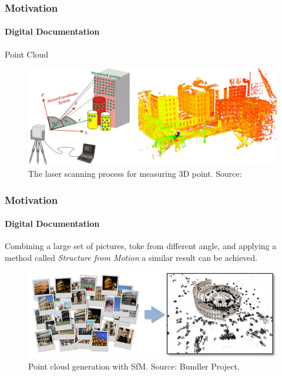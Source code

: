\documentclass{beamer}
\begin{document}
\begin{frame}
    \frametitle{Motivation}
    \framesubtitle{Digital Documentation}

    \begin{block}{Point Cloud}
        \begin{figure}
        \includegraphics[scale=.2]{images/pc}
        \caption{The laser scanning process for measuring 3D point. Source: \citep{tang2010automatic}}
        \end{figure}
    \end{block}    
\end{frame}

\begin{frame}
    \frametitle{Motivation}
    \framesubtitle{Digital Documentation}
    \justifying
    Combining a large set of pictures, toke from different angle, and applying a method called \textit{Structure from Motion} a similar result can be achieved.

    \begin{figure}
        \centering
        \includegraphics[scale=.7]{images/Colosseum}
        \caption{Point cloud generation with SfM. Source: Bundler Project.}
    \end{figure}
\end{frame}
\end{document}

